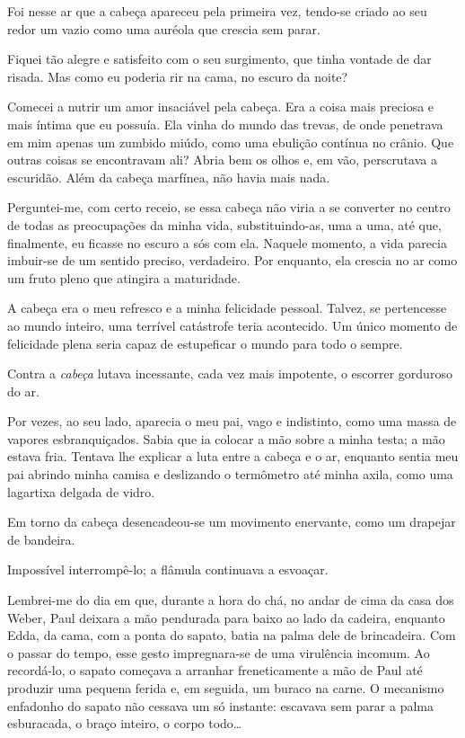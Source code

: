 Foi nesse ar que a cabeça apareceu pela primeira vez, tendo-se criado ao seu redor um vazio como uma auréola que crescia sem parar.

Fiquei tão alegre e satisfeito com o seu surgimento, que tinha vontade de dar risada. Mas como eu poderia rir na cama, no escuro da noite?

Comecei a nutrir um amor insaciável pela cabeça. Era a coisa mais preciosa e mais íntima que eu possuía. Ela vinha do mundo das trevas, de onde penetrava em mim apenas um zumbido miúdo, como uma ebulição contínua no crânio. Que outras coisas se encontravam ali? Abria bem os olhos e, em vão, perscrutava a escuridão. Além da cabeça marfínea, não havia mais nada.

Perguntei-me, com certo receio, se essa cabeça não viria a se converter no centro de todas as preocupações da minha vida, substituindo-as, uma a uma, até que, finalmente, eu ficasse no escuro a sós com ela. Naquele momento, a vida parecia imbuir-se de um sentido preciso, verdadeiro. Por enquanto, ela crescia no ar como um fruto pleno que atingira a maturidade.

A cabeça era o meu refresco e a minha felicidade pessoal. Talvez, se pertencesse ao mundo inteiro, uma terrível catástrofe teria acontecido. Um único momento de felicidade plena seria capaz de estupeficar o mundo para todo o sempre.

Contra a \textit{cabeça} lutava incessante, cada vez mais impotente, o escorrer gorduroso do ar.

Por vezes, ao seu lado, aparecia o meu pai, vago e indistinto, como uma massa de vapores esbranquiçados. Sabia que ia colocar a mão sobre a minha testa; a mão estava fria. Tentava lhe explicar a luta entre a cabeça e o ar, enquanto sentia meu pai abrindo minha camisa e deslizando o termômetro até minha axila, como uma lagartixa delgada de vidro.

Em torno da cabeça desencadeou-se um movimento enervante, como um drapejar de bandeira.

Impossível interrompê-lo; a flâmula continuava a esvoaçar.

Lembrei-me do dia em que, durante a hora do chá, no andar de cima da casa dos Weber, Paul deixara a mão pendurada para baixo ao lado da cadeira, enquanto Edda, da cama, com a ponta do sapato, batia na palma dele de brincadeira. Com o passar do tempo, esse gesto impregnara-se de uma virulência incomum. Ao recordá-lo, o sapato começava a arranhar freneticamente a mão de Paul até produzir uma pequena ferida e, em seguida, um buraco na carne. O mecanismo enfadonho do sapato não cessava um só instante: escavava sem parar a palma esburacada, o braço inteiro, o corpo todo\dots

